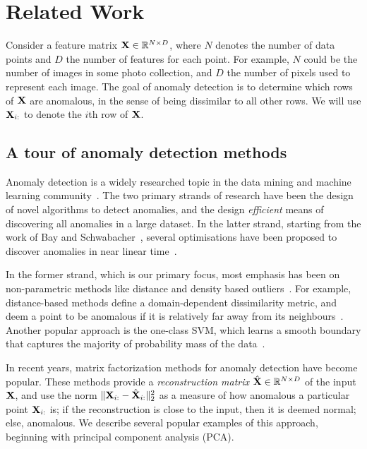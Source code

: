 \section{Related Work}
\label{unsupervisedDAD:RelatedWork}

Consider a feature matrix $\mathbf{X} \in \mathbb{R}^{N \times D}$,
where $N$ denotes the number of data points and $D$ the number of features for each point.
For example, $N$ could be the number of images in some photo collection, and $D$ the number of pixels used to represent each image.
The goal of anomaly detection is to determine which rows of $\mathbf{X}$ are anomalous, in the sense of being dissimilar to all other rows.
We will use $\mathbf{X}_{i :}$ to denote the $i$th row of $\mathbf{X}$.

%
\subsection{A tour of anomaly detection methods}

Anomaly detection is a widely researched topic in the data mining and machine learning community~\cite{chandola2007outlier,charubook}.
The two primary strands of research have been the design of novel algorithms to detect anomalies,
and the design \emph{efficient} means of discovering all anomalies in a large dataset.
In the latter strand, starting from the work of Bay and Schwabacher~\cite{bay03}, several optimisations have been proposed to discover anomalies in near linear time~\cite{Ghoting:2008}.

In the former strand, which is our primary focus, most emphasis has been on non-parametric methods like distance and density based outliers~\cite{knorr1997unified,breunig2000lof}.
For example, distance-based methods define a domain-dependent dissimilarity metric, and deem a point to be anomalous if it is relatively far away from its neighbours~\cite{Zhao:2009}.
Another popular approach is the one-class SVM, which learns a smooth boundary that captures the majority of probability mass of the data~\cite{Scholkopf:2001}.


In recent years,
matrix factorization methods for anomaly detection have become popular.
These methods provide a \emph{reconstruction matrix} $\hat{\mathbf{X}} \in \mathbb{R}^{N \times D}$ of the input $\mathbf{X}$, and use the norm $\| \mathbf{X}_{i :} - \hat{\mathbf{X}}_{i :} \|_2^2$ as a measure of how anomalous a particular point $\mathbf{X}_{i :}$ is;
if the reconstruction is close to the input, then it is deemed normal;
else, anomalous.
We describe several popular examples of this approach, beginning with principal component analysis (PCA).



